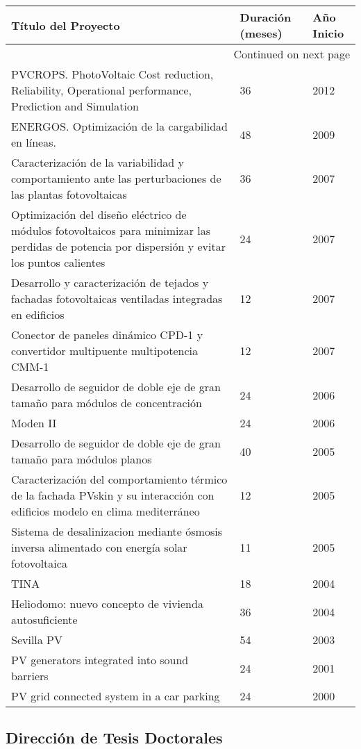 \documentclass[article, a4paper]{memoir}
\begin{document}
\begin{longtable}{p{110mm}|p{17mm}|p{25mm}}
Título del Proyecto & Duración (meses) & Año Inicio\\
\hline
\endhead
\hline\multicolumn{3}{r}{Continued on next page} \\
\endfoot
\endlastfoot
PVCROPS. PhotoVoltaic Cost reduction, Reliability, Operational performance, Prediction and Simulation & 36 & 2012\\
ENERGOS. Optimización de la cargabilidad en líneas. & 48 & 2009\\
Caracterización de la variabilidad y comportamiento ante las perturbaciones de las plantas fotovoltaicas & 36 & 2007\\
Optimización del diseño eléctrico de módulos fotovoltaicos para minimizar las perdidas de potencia por dispersión y evitar los puntos calientes & 24 & 2007\\
Desarrollo y caracterización de tejados y fachadas fotovoltaicas ventiladas integradas en edificios & 12 & 2007\\
Conector de paneles dinámico CPD-1 y convertidor multipuente multipotencia CMM-1 & 12 & 2007\\
Desarrollo de seguidor de doble eje de gran tamaño para módulos de concentración & 24 & 2006\\
Moden II & 24 & 2006\\
Desarrollo de seguidor de doble eje de gran tamaño para módulos planos & 40 & 2005\\
Caracterización del comportamiento térmico de la fachada PVskin y su interacción con edificios modelo en clima mediterráneo & 12 & 2005\\
Sistema de desalinizacion mediante ósmosis inversa alimentado con energía solar fotovoltaica & 11 & 2005\\
TINA & 18 & 2004\\
Heliodomo: nuevo concepto de vivienda autosuficiente & 36 & 2004\\
Sevilla PV & 54 & 2003\\
PV generators integrated into sound barriers & 24 & 2001\\
PV grid connected system in a car parking & 24 & 2000\\
\end{longtable}


\subsection{Dirección de Tesis Doctorales}
\label{sec-4-4}
\end{document}
